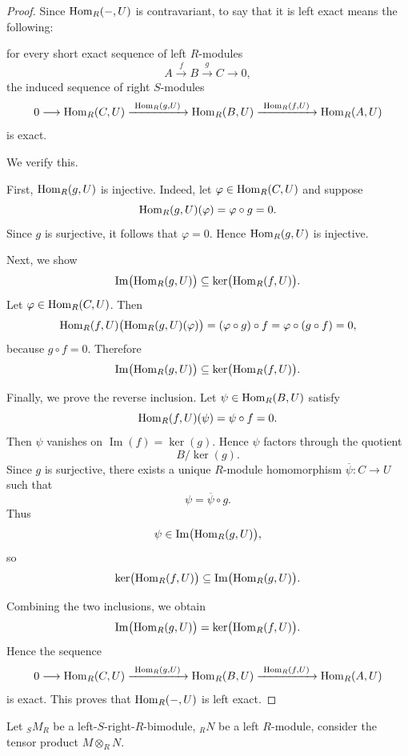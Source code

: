 \begin{proof}
    Since $\mathrm{Hom}_R(-,U)$ is contravariant, to say that it is left exact means the following:

    for every short exact sequence of left $R$-modules
    \[
        A \xrightarrow{\,f\,} B \xrightarrow{\,g\,} C  \longrightarrow 0,
    \]
    the induced sequence of right $S$-modules
    \[
        0 \longrightarrow \mathrm{Hom}_R(C,U)
        \xrightarrow{\ \mathrm{Hom}_R(g,U)\ }
        \mathrm{Hom}_R(B,U)
        \xrightarrow{\ \mathrm{Hom}_R(f,U)\ }
        \mathrm{Hom}_R(A,U)
    \]
    is exact.

    We verify this.

    First, $\mathrm{Hom}_R(g,U)$ is injective. Indeed, let $\varphi \in \mathrm{Hom}_R(C,U)$ and suppose
    \[
        \mathrm{Hom}_R(g,U)(\varphi)=\varphi\circ g=0.
    \]
    Since $g$ is surjective, it follows that $\varphi=0$. Hence $\mathrm{Hom}_R(g,U)$ is injective.

    Next, we show
    \[
        \operatorname{Im}\bigl(\mathrm{Hom}_R(g,U)\bigr)\subseteq \ker\bigl(\mathrm{Hom}_R(f,U)\bigr).
    \]
    Let $\varphi\in \mathrm{Hom}_R(C,U)$. Then
    \[
        \mathrm{Hom}_R(f,U)\bigl(\mathrm{Hom}_R(g,U)(\varphi)\bigr)
        =
        (\varphi\circ g)\circ f
        =
        \varphi\circ (g\circ f)
        =
        0,
    \]
    because $g\circ f=0$. Therefore
    \[
        \operatorname{Im}\bigl(\mathrm{Hom}_R(g,U)\bigr)\subseteq \ker\bigl(\mathrm{Hom}_R(f,U)\bigr).
    \]

    Finally, we prove the reverse inclusion. Let $\psi\in \mathrm{Hom}_R(B,U)$ satisfy
    \[
        \mathrm{Hom}_R(f,U)(\psi)=\psi\circ f=0.
    \]
    Then $\psi$ vanishes on $\operatorname{Im}(f)=\ker(g)$. Hence $\psi$ factors through the quotient
    \[
        B/\ker(g).
    \]
    Since $g$ is surjective, there exists a unique $R$-module homomorphism $\overline{\psi}:C\to U$ such that
    \[
        \psi=\overline{\psi}\circ g.
    \]
    Thus
    \[
        \psi\in\operatorname{Im}\bigl(\mathrm{Hom}_R(g,U)\bigr),
    \]
    so
    \[
        \ker\bigl(\mathrm{Hom}_R(f,U)\bigr)\subseteq\operatorname{Im}\bigl(\mathrm{Hom}_R(g,U)\bigr).
    \]

    Combining the two inclusions, we obtain
    \[
        \operatorname{Im}\bigl(\mathrm{Hom}_R(g,U)\bigr)=\ker\bigl(\mathrm{Hom}_R(f,U)\bigr).
    \]
    Hence the sequence
    \[
        0 \longrightarrow \mathrm{Hom}_R(C,U)
        \xrightarrow{\ \mathrm{Hom}_R(g,U)\ }
        \mathrm{Hom}_R(B,U)
        \xrightarrow{\ \mathrm{Hom}_R(f,U)\ }
        \mathrm{Hom}_R(A,U)
    \]
    is exact. This proves that $\mathrm{Hom}_R(-,U)$ is left exact.
\end{proof}

Let ${}_SM_R$ be a left-$S$-right-$R$-bimodule, ${}_R N$ be a left $R$-module, consider the tensor product $M \otimes_R N$.

